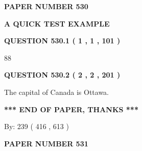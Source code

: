 \documentclass[12pt]{article}
\begin{document}
   
   
   
\newpage 
\setcounter{page}{ 
   530001 } 
   
   
   
   
 {\textbf{ \Large{ PAPER NUMBER  530  }}}
   
   
\vspace{0.2in}
   
   
   
   
   
   
 \vspace{0.2in}
{\LARGE {\textbf{ A QUICK TEST EXAMPLE}}}
   
   
  
\vspace{0.2in}
  
{\textbf{\Large{QUESTION
530.1 
 ( 1 , 1 , 101 )
}}}
  
  
 
 
\noindent{}

88
 
 
  
\vspace{0.2in}
  
{\textbf{\Large{QUESTION
530.2 
 ( 2 , 2 , 201 )
}}}
  
  
 
 
\noindent{}
 
 
The capital of Canada is Ottawa.
 
 
 
 
   
   
 \vspace{0.2in}
 
   
   
   
   
\vspace{1.0in} 
{\textbf{\large{ *** END OF PAPER, THANKS *** }}} 
   
   
\hspace{1.0in} By: 
 239 ( 416 ,  613 )
   
   
   
   
\newpage 
\setcounter{page}{ 
   531001 } 
   
   
   
   
 {\textbf{ \Large{ PAPER NUMBER  531  }}}
   
\end{document}
